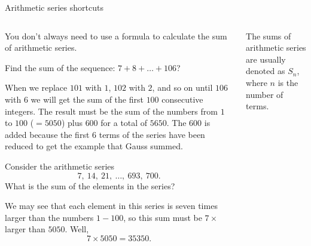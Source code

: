 \documentclass[9pt,aspectratio=169]{beamer}
\begin{document}
\begin{frame}{Arithmetic series shortcuts}
  \begin{columns}[T]
    \begin{column}{0.5\textwidth}
      You don't always need to use a formula to calculate the sum of arithmetic series.
      \begin{problem}
        Find the sum of the sequence: $7 + 8 + \ldots + 106$?
      \end{problem}
      When we replace $101$ with $1$, $102$ with $2$, and so on until $106$ with $6$ we will get the sum of the first $100$ consecutive integers. The result must be the sum of the numbers from $1$ to $100$ ($= 5050$) plus $600$ for a total of $5650$.  The $600$ is added because the first $6$ terms of the series have been reduced to get the example that Gauss summed.
      \begin{problem}
        Consider the arithmetic series 
        \[ 7,\ 14,\ 21,\ \ldots,\ 693,\ 700. \]
        What is the sum of the elements in the series?
      \end{problem}
      We may see that each element in this series is seven times larger than the numbers $1-100$, so this sum must be $7 \times$ larger than $5050$. Well, 
      \[ 7 \times 5050 = 35350. \]
    \end{column}
    \begin{column}{0.5\textwidth}
      The sums of arithmetic series are usually denoted as $S_n$, where $n$ is the number of terms.


\end{column}
\end{columns}
\end{frame}
\end{document}
